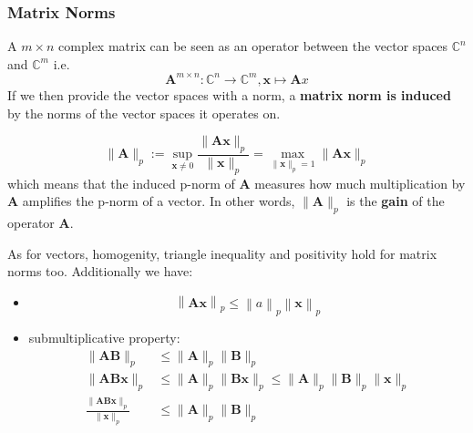 \subsubsection{Matrix Norms}
A $m\times n$ complex matrix can be seen as an operator between the vector spaces $\mathbb{C}^n$ and $\mathbb{C}^m$ i.e.
\begin{equation*}
    \mathbf{A}^{m\times n}:\mathbb{C}^n\to\mathbb{C}^m,\mathbf{x}\mapsto \mathbf{A}x
\end{equation*}
If we then provide the vector spaces with a norm, a \textbf{matrix norm is induced} by the norms of the vector spaces it operates on.

\begin{equation*}
    \|\mathbf{A}\|_p:=\sup_{\mathbf{x}\neq0}\frac{\|\mathbf{Ax}\|_p}{\|\mathbf{x}\|_p}=\max_{\|\mathbf{x}\|_p=1}\|\mathbf{Ax}\|_p
\end{equation*}
which means that the induced p-norm of $\mathbf{A}$ measures how much multiplication by $\mathbf{A}$ amplifies the p-norm of a vector. In other words, $\|\mathbf{A}\|_p$ is the \textbf{gain} of the operator $\mathbf{A}$.

\newpar{}

As for vectors, homogenity, triangle inequality and positivity hold for matrix norms too. Additionally we have:
\begin{itemize}
    \item
          \noindent\begin{equation*}
              \left\|\mathbf{Ax}\right\|_p\leq\left\|a\right\|_p\left\|\mathbf{x}\right\|_p
          \end{equation*}
    \item submultiplicative property:
          \begin{align*}
              \|\mathbf{AB}\|_p                                     & \leq\|\mathbf{A}\|_p\|\mathbf{B}\|_p                                                      \\
              \|\mathbf{AB} \mathbf{x}\|_p                          & \leq\|\mathbf{A}\|_p\|\mathbf{Bx}\|_p\leq\|\mathbf{A}\|_p\|\mathbf{B}\|_p\|\mathbf{x}\|_p \\
              \frac{\|\mathbf{AB} \mathbf{x}\|_p}{\|\mathbf{x}\|_p} & \leq\|\mathbf{A}\|_p\|\mathbf{B}\|_p
          \end{align*}
\end{itemize}


